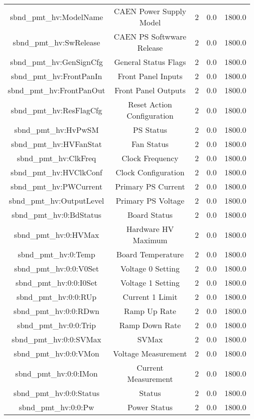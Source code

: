 \begin{center}
\begin{longtable}{c | c c c c }
sbnd\_pmt\_hv:ModelName & CAEN Power Supply Model & 2 & 0.0 & 1800.0\\ 
sbnd\_pmt\_hv:SwRelease & CAEN PS Softwware Release & 2 & 0.0 & 1800.0\\ 
sbnd\_pmt\_hv:GenSignCfg & General Status Flags & 2 & 0.0 & 1800.0\\ 
sbnd\_pmt\_hv:FrontPanIn & Front Panel Inputs & 2 & 0.0 & 1800.0\\ 
sbnd\_pmt\_hv:FrontPanOut & Front Panel Outputs & 2 & 0.0 & 1800.0\\ 
sbnd\_pmt\_hv:ResFlagCfg & Reset Action Configuration & 2 & 0.0 & 1800.0\\ 
sbnd\_pmt\_hv:HvPwSM & PS Status & 2 & 0.0 & 1800.0\\ 
sbnd\_pmt\_hv:HVFanStat & Fan Status & 2 & 0.0 & 1800.0\\ 
sbnd\_pmt\_hv:ClkFreq & Clock Frequency & 2 & 0.0 & 1800.0\\ 
sbnd\_pmt\_hv:HVClkConf & Clock Configuration & 2 & 0.0 & 1800.0\\ 
sbnd\_pmt\_hv:PWCurrent & Primary PS Current & 2 & 0.0 & 1800.0\\ 
sbnd\_pmt\_hv:OutputLevel & Primary PS Voltage & 2 & 0.0 & 1800.0\\ 
sbnd\_pmt\_hv:0:BdStatus & Board Status & 2 & 0.0 & 1800.0\\ 
sbnd\_pmt\_hv:0:HVMax & Hardware HV Maximum & 2 & 0.0 & 1800.0\\ 
sbnd\_pmt\_hv:0:Temp & Board Temperature & 2 & 0.0 & 1800.0\\ 
sbnd\_pmt\_hv:0:0:V0Set & Voltage 0 Setting & 2 & 0.0 & 1800.0\\ 
sbnd\_pmt\_hv:0:0:I0Set & Voltage 1 Setting & 2 & 0.0 & 1800.0\\ 
sbnd\_pmt\_hv:0:0:RUp & Current 1 Limit & 2 & 0.0 & 1800.0\\ 
sbnd\_pmt\_hv:0:0:RDwn & Ramp Up Rate & 2 & 0.0 & 1800.0\\ 
sbnd\_pmt\_hv:0:0:Trip & Ramp Down Rate & 2 & 0.0 & 1800.0\\ 
sbnd\_pmt\_hv:0:0:SVMax & SVMax & 2 & 0.0 & 1800.0\\ 
sbnd\_pmt\_hv:0:0:VMon & Voltage Measurement & 2 & 0.0 & 1800.0\\ 
sbnd\_pmt\_hv:0:0:IMon & Current Measurement & 2 & 0.0 & 1800.0\\ 
sbnd\_pmt\_hv:0:0:Status & Status & 2 & 0.0 & 1800.0\\ 
sbnd\_pmt\_hv:0:0:Pw & Power Status & 2 & 0.0 & 1800.0\\ 

\end{longtable}
\end{center}
